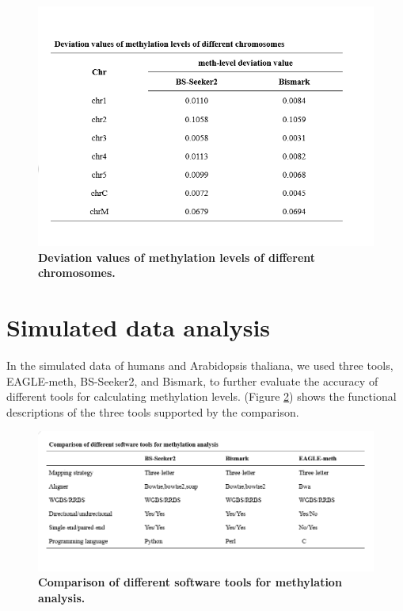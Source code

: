 \documentclass{PHlab-thesis}
\begin{document}
\begin{figure}[h]
  \centering
  \includegraphics[scale=0.8]{table/table5.png}
  \caption{\textbf{Deviation values of methylation levels of different chromosomes.}
  }
  \label{f12}
\end{figure}


\section{Simulated data analysis}
In the simulated data of humans and Arabidopsis thaliana, we used three tools, EAGLE-meth, BS-Seeker2, and Bismark, to further evaluate the accuracy of different tools for calculating methylation levels. (Figure \ref{f13}) shows the functional descriptions of the three tools supported by the comparison.

\begin{figure}[h]
  \centering
  \includegraphics[scale=0.8]{table/table6.png}
  \caption{\textbf{Comparison of different software tools for methylation analysis.}}
  \label{f13}
\end{figure}
\end{document}

